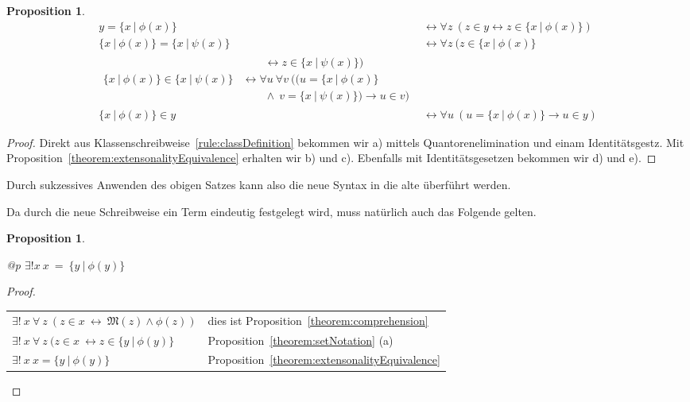 \documentclass[a4paper,german,10pt,twoside]{book}
\newtheorem{prop}[thm]{Proposition}
\theoremstyle{definition}
\theoremstyle{remark}
\begin{document}
\begin{prop}
\begin{align}
y = \{ x~|~ \phi(x) \} & \leftrightarrow  \forall z \ (z \in y \leftrightarrow z \in \{ x~|~\phi(x) \}) \tag{b} \\
\{ x~|~\phi(x) \} = \{ x~|~\psi(x) \} & \leftrightarrow \forall z \ (z \in \{ x~|~\phi(x) \} \tag{c} \\
\begin{split}
  & \qquad \leftrightarrow z \in \{x~|~\psi(x) \}) \nonumber \\
\{ x~|~\phi(x) \} \in \{ x~|~\psi(x) \} & \leftrightarrow  \forall u \ \forall
v \ ((u  = \{ x~|~\phi(x) \} \\
  & \qquad \land \ v = \{ x~|~\psi(x) \}) \rightarrow u \in v) 
\end{split} \tag{d} \\
\{ x~|~\phi(x) \} \in y & \leftrightarrow  \forall u \ (u  = \{ x~|~\phi(x) \}  \rightarrow u \in y) \tag{e} 
\end{align}
\end{prop}
\begin{proof}
Direkt aus Klassenschreibweise~\ref{rule:classDefinition} bekommen wir a) mittels Quantorenelimination und einam Identit{\"a}tsgestz. Mit Proposition~\ref{theorem:extensonalityEquivalence} erhalten wir b) und c). Ebenfalls mit Identit{\"a}tsgesetzen  bekommen wir d) und e).
\end{proof}

Durch sukzessives Anwenden des obigen Satzes kann also die neue Syntax in die alte {\"u}berf{\"u}hrt werden.


\par
Da durch die neue Schreibweise ein Term eindeutig festgelegt wird, muss nat{\"u}rlich auch das Folgende gelten.

\begin{prop}
\label{theorem:setDefinitionUnique} \hypertarget{theorem:setDefinitionUnique}{}
\mbox{}
\begin{longtable}{{@{\extracolsep{\fill}}p{\linewidth}}}
\centering $\exists! x\ x \ =  \ \{ y \ | \ \phi(y) \} $
\end{longtable}

\end{prop}
\begin{proof}
\mbox{}
\par
\begin{tabularx}{\linewidth}{lX}
  $\exists! \ x \ \forall \ z \ ( z \in x \ \leftrightarrow \ \mathfrak{M}(z) \land \phi(z))$
    & dies ist Proposition~\ref{theorem:comprehension} \\
  $\exists! \ x \ \forall \ z \ ( z \in x \ \leftrightarrow z \in \{ y \ | \  \phi(y) \}$
    & Proposition~\ref{theorem:setNotation} (a) \\
  $\exists! \ x \ x = \{ y \ | \  \phi(y) \}$
    & Proposition~\ref{theorem:extensonalityEquivalence}
\end{tabularx}
\end{proof}
\end{document}

